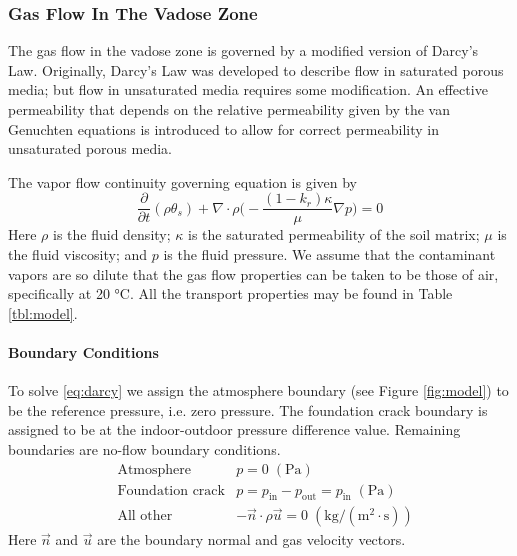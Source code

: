 \subsubsection{Gas Flow In The Vadose Zone}\label{sec:darcy}

The gas flow in the vadose zone is governed by a modified version of Darcy's Law.
Originally, Darcy's Law was developed to describe flow in saturated porous media; but flow in unsaturated media requires some modification\cite{c._w._fetter_contaminant_1993}.
An effective permeability that depends on the relative permeability given by the van Genuchten equations is introduced to allow for correct permeability in unsaturated porous media.\par

The vapor flow continuity governing equation is given by
\begin{equation}\label{eq:darcy}
  \frac{\partial}{\partial t} (\rho \theta_s) + \nabla \cdot \rho \Big( -\frac{(1-k_r) \kappa}{\mu} \nabla p \Big) = 0
\end{equation}
Here $\rho$ is the fluid density;
$\kappa$ is the saturated permeability of the soil matrix;
$\mu$ is the fluid viscosity; and $p$ is the fluid pressure.
We assume that the contaminant vapors are so dilute that the gas flow properties can be taken to be those of air, specifically at 20 \si{\degreeCelsius}.
All the transport properties may be found in Table \ref{tbl:model}.\par

\paragraph{Boundary Conditions}

To solve \eqref{eq:darcy} we assign the atmosphere boundary (see Figure \ref{fig:model}) to be the reference pressure, i.e. zero pressure.
The foundation crack boundary is assigned to be at the indoor-outdoor pressure difference value.
Remaining boundaries are no-flow boundary conditions.
\begin{align}
  &\text{Atmosphere} &p = 0 \; \mathrm{(Pa)} \\
  &\text{Foundation crack} &p = p_\mathrm{in} - p_\mathrm{out} = p_\mathrm{in} \; \mathrm{(Pa)} \\
  &\text{All other} &-\vec{n}\cdot\rho\vec{u} = 0 \; \mathrm{(kg/(m^2\cdot s))}
\end{align}
Here $\vec{n}$ and $\vec{u}$ are the boundary normal and gas velocity vectors.

